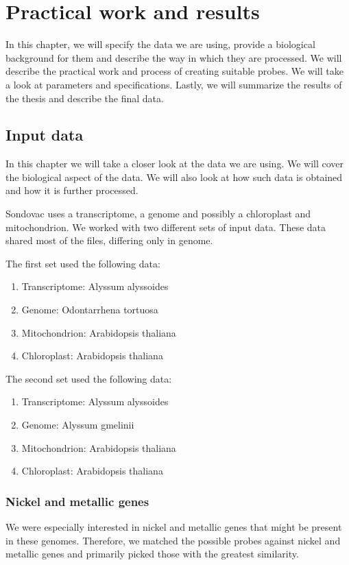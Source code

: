 \chapter[Practical work and results]{Practical work and results}
\label{kap:results}

In this chapter,  we will specify the data we are using, provide a biological background for them and describe the way in which they are processed. 
We will describe the practical work and process of creating suitable probes. We will take a look at parameters and specifications. 
Lastly, we will summarize the results of the thesis and describe the final data. 

\section{Input data}
In this chapter we will take a closer look at the data we are using. We will cover the biological aspect of 
the data. %
We will also look at how such data is obtained and how it is further processed. 

Sondovac uses a transcriptome, a genome and possibly a chloroplast and mitochondrion. 
We worked with two different sets of input data. These data shared most of the files, differing only in genome. 

The first set used the following data: 

\begin{enumerate}
\item Transcriptome: Alyssum alyssoides
\item Genome: Odontarrhena tortuosa
\item Mitochondrion: Arabidopsis thaliana
\item Chloroplast: Arabidopsis thaliana
\end{enumerate}

The second set used the following data: 

\begin{enumerate}
\item Transcriptome: Alyssum alyssoides
\item Genome: Alyssum gmelinii
\item Mitochondrion: Arabidopsis thaliana
\item Chloroplast: Arabidopsis thaliana
\end{enumerate}

\subsection{Nickel and metallic genes}
We were especially interested in nickel and metallic genes that might be present in these genomes. Therefore, we matched the possible 
probes against nickel and metallic genes and primarily picked those with the greatest similarity. 

